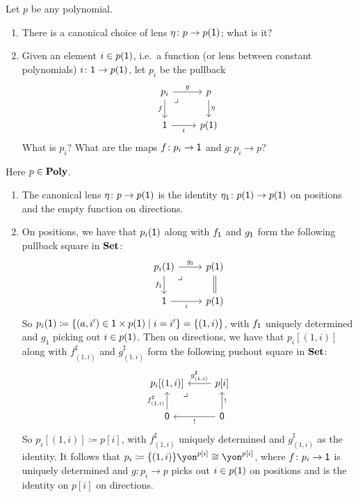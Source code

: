 \documentclass[Book-Poly]{subfiles}
\begin{document}
\begin{exercise}
Let $p$ be any polynomial.
\begin{enumerate}
	\item There is a canonical choice of lens $\eta\colon p\to p(\textsf{1})$; what is it?
	\item Given an element $i\in p(\textsf{1})$, i.e.\ a function (or lens between constant polynomials) $i\colon\textsf{1}\to p(\textsf{1})$, let $p_i$ be the pullback
	\[
	\begin{tikzcd}
	p_i\ar[r, "g"]\ar[d, "f"']&
	p\ar[d, "\eta"]\\
	\1\ar[r, "i"']&
	p(\1)\ar[ul, phantom, very near end, "\lrcorner"]
	\end{tikzcd}
	\]
	What is $p_i$? What are the maps $f \colon p_i \to \textsf{1}$ and $g \colon p_i \to p$? \qedhere
\end{enumerate}
\begin{solution}
Here $p \in \mathbf{Poly}$.
\begin{enumerate}
    \item The canonical lens $\eta \colon p \to p(\textsf{1})$ is the identity $\eta_{\textsf{1}} \colon p(\textsf{1}) \to p(\textsf{1})$ on positions and the empty function on directions.
    
    \item On positions, we have that $p_i(\textsf{1})$ along with $f_{\textsf{1}}$ and $g_{\textsf{1}}$ form the following pullback square in $\mathbf{Set}$:
    \[
	\begin{tikzcd}
    	p_i(\1) \ar[r, "g_\1"] \ar[d, "f_\1"'] &
    	p(\1) \ar[d, equals] \\
    	\1 \ar[r, "i"'] &
    	p(\1) \ar[ul, phantom, very near end, "\lrcorner"]
	\end{tikzcd}
	\]
	So $p_i(\textsf{1}) \coloneqq \{(a, i') \in \textsf{1} \times p(\textsf{1}) \mid i = i' \} = \{(1, i)\}$, with $f_{\textsf{1}}$ uniquely determined and $g_1$ picking out $i \in p(\textsf{1})$.
	Then on directions, we have that $p_i[(1,i)]$ along with $f^\sharp_{(1,i)}$ and $g^\sharp_{(1,i)}$ form the following pushout square in $\mathbf{Set}$:
	\[
	\begin{tikzcd}
    	p_i[(1,i)] \ar[from=r, "g^\sharp_{(1,i)}"'] \ar[from=d, "f^\sharp_{(1,i)}"] &
    	p[i] \ar[from=d, "!"'] \\
    	\0 \ar[from=r, "!"] &
    	\0 \ar[ul, phantom, very near end, "\lrcorner"]
    \end{tikzcd}
    \]
    So $p_i[(1,i)] \coloneqq p[i]$, with $f^\sharp_{(1,i)}$ uniquely determined and $g^\sharp_{(1,i)}$ as the identity.
    It follows that $p_i \coloneqq \{(1,i)\}\yon^{p[i]} \iso \yon^{p[i]}$, where $f \colon p_i \to \textsf{1}$ is uniquely determined and $g \colon p_i \to p$ picks out $i \in p(\textsf{1})$ on positions and is the identity on $p[i]$ on directions.
\end{enumerate}
\end{solution}
\end{exercise}
\end{document}
